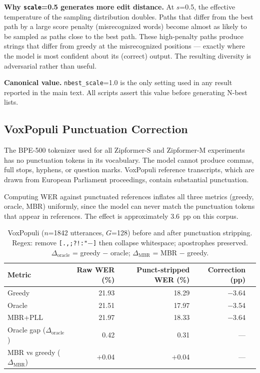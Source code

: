 \textbf{Why \texttt{scale}=0.5 generates more edit distance.}  At $s$=0.5, the effective
temperature of the sampling distribution doubles. Paths that differ from the best path by a
large score penalty (misrecognized words) become almost as likely to be sampled as paths close
to the best path. These high-penalty paths produce strings that differ from greedy at the
misrecognized positions — exactly where the model is most confident about its (correct) output.
The resulting diversity is adversarial rather than useful.

\textbf{Canonical value.}  \texttt{nbest\_scale}=1.0 is the only setting used in any result
reported in the main text. All scripts assert this value before generating N-best lists.



\subsection{VoxPopuli Punctuation Correction}

The BPE-500 tokenizer used for all Zipformer-S and Zipformer-M experiments has no punctuation
tokens in its vocabulary. The model cannot produce commas, full stops, hyphens, or question marks.
VoxPopuli reference transcripts, which are drawn from European Parliament proceedings, contain
substantial punctuation.

Computing WER against punctuated references inflates all three metrics (greedy, oracle, MBR)
uniformly, since the model can never match the punctuation tokens that appear in references.
The effect is approximately 3.6~pp on this corpus.

\begin{table}[t]
\centering
\small
\caption{VoxPopuli ($n$=1842 utterances, $G$=128) before and after punctuation stripping.
Regex: remove \texttt{[.,;?!:"$-$]} then collapse whitespace; apostrophes preserved.
$\Delta_{\text{oracle}}$ = greedy $-$ oracle; $\Delta_{\text{MBR}}$ = MBR $-$ greedy.}
\label{tab:voxpopuli-punct}
\begin{tabular}{lrrrr}
\hline
Metric & Raw WER (\%) & Punct-stripped WER (\%) & Correction (pp) \\
\hline
Greedy     & 21.93 & 18.29 & $-$3.64 \\
Oracle     & 21.51 & 17.97 & $-$3.54 \\
MBR+PLL    & 21.97 & 18.33 & $-$3.64 \\
\hline
Oracle gap ($\Delta_\text{oracle}$)  & 0.42 & 0.31 & --- \\
MBR vs greedy ($\Delta_\text{MBR}$) & $+$0.04 & $+$0.04 & --- \\
\hline
\end{tabular}
\end{table}

